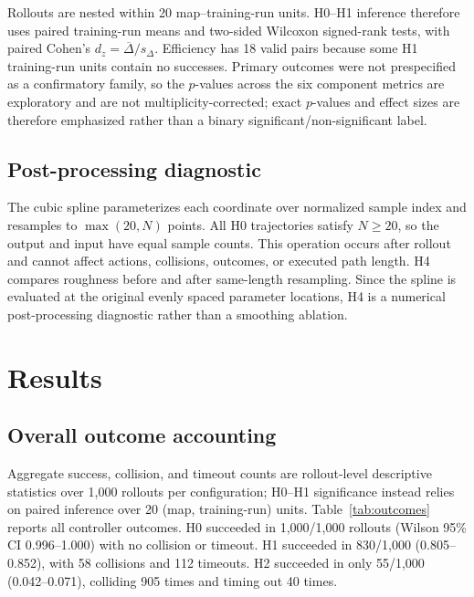 \documentclass[conference]{IEEEtran}
\begin{document}
Rollouts are nested within 20 map--training-run units. H0--H1 inference therefore uses paired training-run means and two-sided Wilcoxon signed-rank tests, with paired Cohen's $d_z=\overline{\Delta}/s_\Delta$. Efficiency has 18 valid pairs because some H1 training-run units contain no successes. Primary outcomes were not prespecified as a confirmatory family, so the $p$-values across the six component metrics are exploratory and are not multiplicity-corrected; exact $p$-values and effect sizes are therefore emphasized rather than a binary significant/non-significant label.

\subsection{Post-processing diagnostic}
The cubic spline parameterizes each coordinate over normalized sample index and resamples to $\max(20,N)$ points. All H0 trajectories satisfy $N\ge20$, so the output and input have equal sample counts. This operation occurs after rollout and cannot affect actions, collisions, outcomes, or executed path length. H4 compares roughness before and after same-length resampling. Since the spline is evaluated at the original evenly spaced parameter locations, H4 is a numerical post-processing diagnostic rather than a smoothing ablation.

\section{Results}\label{sec:results}
\subsection{Overall outcome accounting}
Aggregate success, collision, and timeout counts are rollout-level descriptive statistics over 1,000 rollouts per configuration; H0--H1 significance instead relies on paired inference over 20 (map, training-run) units. Table~\ref{tab:outcomes} reports all controller outcomes. H0 succeeded in 1,000/1,000 rollouts (Wilson 95\% CI 0.996--1.000) with no collision or timeout. H1 succeeded in 830/1,000 (0.805--0.852), with 58 collisions and 112 timeouts. H2 succeeded in only 55/1,000 (0.042--0.071), colliding 905 times and timing out 40 times.

\begin{table}[t]
\centering
\caption{Rollout outcomes and success-only path efficiency (mean $\pm$ SD).}
\label{tab:outcomes}
\end{table}
\end{document}
